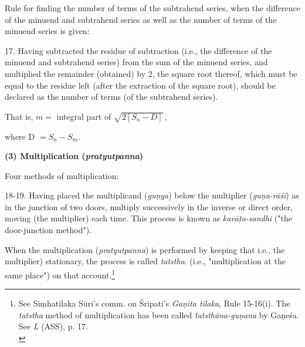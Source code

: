\documentclass[10pt, openany]{book}
\begin{document}
{{{{{{{{{{{{{{{{{{{{\begin{sloppypar}
\noindent Rule for finding the number of terms of the subtrahend series,
when the difference of the minuend and subtrahend series as
well as the number of terms of the minuend series is given:
\vspace{3mm}

 17.  Having subtracted the residue of subtraction (i.e.,
the difference of the minuend and subtrahend series) from
the sum of the minuend series, and multiplied the remainder
(obtained) by 2, the square root thereof, which must be equal to the residue left (after the extraction of the square root),
should be declared as the number of terms (of the subtrahend
series).

\end{sloppypar}


\newpage

\begin{sloppypar}

{\small  That is, \hspace{5mm} $m =$ integral part of $\sqrt{2[S_n-D]}$\,,
\vspace{2mm}

 \hspace{7mm} where D $= {S_n}-{S_m}$.}
\vspace{3mm}

  \begin{center}
  \textbf{(3) Multiplication (\textit{pratyutpanna})} \end{center}

\noindent Four methods of multiplication:
\vspace{3mm}

 18-19.  Having placed the multiplicand (\textit{guṇya}) below
the multiplier (\textit{guṇa-rāśi}) as in the junction of two doors,
multiply successively in the inverse or direct order, moving
(the multiplier) each time. This process is known as \textit{kavāṭa-sandhi} ("the door-junction method").
\vspace{3mm}

 When the multiplication (\textit{pratyutpanna}) is performed by
keeping that i.e., the multiplier) stationary, the process is
called \textit{tatstha}. (i.e., "multiplication at the same place") on
that account.\renewcommand{\thefootnote}{1}\footnote{\hspace{-2mm} \en See  Siṃhatilaka Sūri's comm. on  Śripati's \textit{Gaṇita tilaka}, Rule 15-16(i). The \textit{tatstha} method of multiplication has been called  \textit{tatsthāna-guṇana} by Gaṇeśa. See \textit{L} (ASS), p. 17.\\}
\vspace{3mm}


\end{sloppypar}}}}}}}}}}}}}}}}}}}}}
\end{document}
